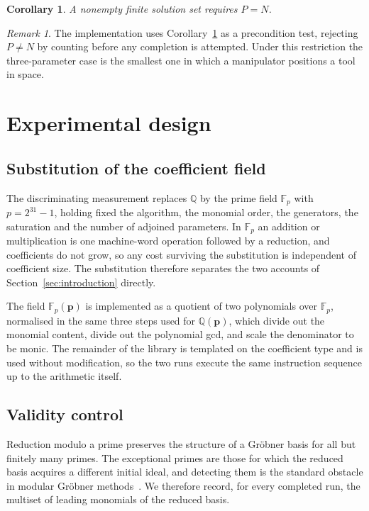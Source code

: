\documentclass[11pt,a4paper]{article}
\theoremstyle{plain}
\newtheorem{corollary}[proposition]{Corollary}
\theoremstyle{definition}
\theoremstyle{remark}
\newtheorem{remark}[proposition]{Remark}
\newcommand{\FF}{\mathbb{F}}
\newcommand{\QQ}{\mathbb{Q}}
\newcommand{\bp}{\boldsymbol{p}}
\begin{document}
\begin{corollary}
\label{cor:pn}
A nonempty finite solution set requires $P = N$.
\end{corollary}

\begin{remark}
\label{rem:precondition}
The implementation uses Corollary~\ref{cor:pn} as a precondition test, rejecting $P \neq N$ by
counting before any completion is attempted. Under this restriction the three-parameter case is the
smallest one in which a manipulator positions a tool in space.
\end{remark}

\section{Experimental design}
\label{sec:design}

\subsection{Substitution of the coefficient field}

The discriminating measurement replaces $\QQ$ by the prime field $\FF_p$ with $p = 2^{31} - 1$,
holding fixed the algorithm, the monomial order, the generators, the saturation and the number of
adjoined parameters. In $\FF_p$ an addition or multiplication is one machine-word operation followed
by a reduction, and coefficients do not grow, so any cost surviving the substitution is independent of
coefficient size. The substitution therefore separates the two accounts of Section~\ref{sec:introduction}
directly.

The field $\FF_p(\bp)$ is implemented as a quotient of two polynomials over $\FF_p$, normalised in the
same three steps used for $\QQ(\bp)$, which divide out the monomial content, divide out the polynomial
gcd, and scale the denominator to be monic. The remainder of the library is templated on the coefficient
type and is used without modification, so the two runs execute the same instruction sequence up to the
arithmetic itself.

\subsection{Validity control}

Reduction modulo a prime preserves the structure of a Gr\"obner basis for all but finitely many
primes. The exceptional primes are those for which the reduced basis acquires a different initial
ideal, and detecting them is the standard obstacle in modular Gr\"obner methods~\cite{arnold2003}. We
therefore record, for every completed run, the multiset of leading monomials of the reduced basis.
\end{document}
